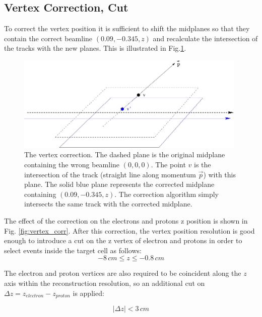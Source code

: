 \clearpage\newpage

\subsection{Vertex Correction, Cut}
To correct the vertex position it is sufficient to shift the midplanes
so that they contain the correct beamline $(0.09, -0.345, z)$ and recalculate 
the intersection of the tracks with the new planes.
This is illustrated in Fig.\ref{fig:vertex}.

\begin{figure}[h]
	\centering
		\includegraphics[width=0.98\textwidth ]{img/corr_vertex.jpg}
			\caption{The vertex correction. The dashed plane is the original midplane
						containing the wrong beamline $(0, 0, 0)$. The point $v$ is the 
						intersection of the track (straight line along momentum $\vec p$)
						with this plane. The solid blue plane represents the corrected
						midplane containing $(0.09, -0.345, z)$. The correction algorithm 
						simply intersects the same track with the corrected midplane. }
			\label{fig:vertex}
\end{figure}


\vspace{1cm}
The effect of the correction on the electrons and protons z position
is shown in Fig. \ref{fig:vertex_corr}. 
After this correction, the vertex position resolution is good enough to
introduce a cut on the z vertex of electron and protons in order to
select events inside the target cell as follows:
\begin{equation}
 -8\, cm \le z \le -0.8\, cm
\label{eqn:vertex_cut1} 
\end{equation}

The electron and proton vertices are also required to be coincident along the $z$ axis
within the reconstruction resolution, so an additional cut on
$\Delta z = z_{electron} - z_{proton}$ is applied:

\begin{equation}
 \left| \Delta z \right| < 3 \,cm
 \label{eqn:vertex_cut2} 
\end{equation}

